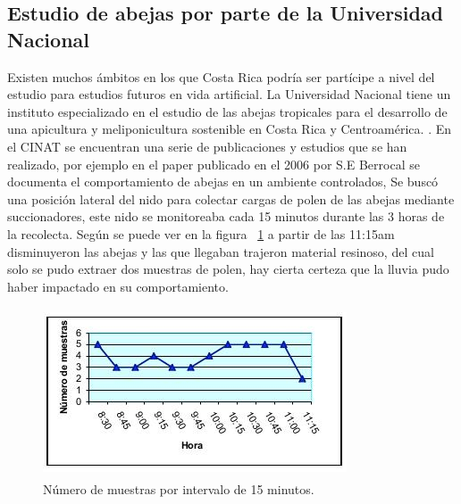 \documentclass[conference]{IEEEtran}
\begin{document}
\subsection{Estudio de abejas por parte de la Universidad Nacional}
Existen muchos \'ambitos en los que Costa Rica podr\'ia ser part\'icipe a nivel del estudio para estudios futuros en vida artificial. La Universidad Nacional tiene un instituto especializado en el estudio de las abejas tropicales para el desarrollo de una apicultura y meliponicultura sostenible en Costa Rica y Centroam\'erica. \cite{CINAT} . En el CINAT se encuentran una serie de publicaciones y estudios que se han realizado, por ejemplo en el paper publicado en el 2006 por S.E Berrocal se documenta el comportamiento de abejas en un ambiente controlados, Se busc\'o una posici\'on lateral del nido para colectar cargas de polen de las abejas mediante succionadores, este nido se monitoreaba cada 15 minutos durante las 3 horas de la recolecta. Seg\'un se puede ver en la figura ~\ref{fig:muestra} a partir de las 11:15am disminuyeron las abejas y las que llegaban trajeron material resinoso, del cual solo se pudo extraer dos muestras de polen, hay cierta certeza que la lluvia pudo haber impactado en su comportamiento.\cite{APICOLA}
\begin{figure}[ht]
  \includegraphics[width=9cm,height=5cm]{img/muestras.jpg}
  \caption{N\'umero de muestras por intervalo de 15 minutos. \cite{APICOLA}}
  \label{fig:muestra}
\end{figure}
\end{document}
